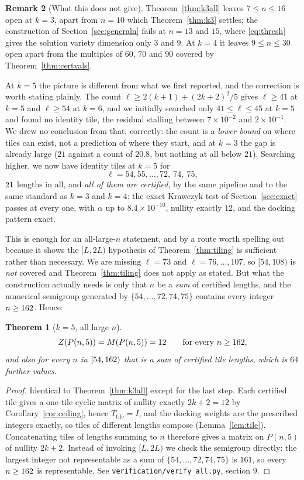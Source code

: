 \documentclass[11pt]{article}
\newtheorem{theorem}{Theorem}
\theoremstyle{definition}
\newtheorem{remark}[theorem]{Remark}
\begin{document}
\begin{remark}[What this does not give]
Theorem~\ref{thm:k3all} leaves $7\le n\le16$ open at $k=3$, apart from $n=10$
which Theorem~\ref{thm:k3} settles; the construction of
Section~\ref{sec:generaln} fails at $n=13$ and $15$, where \eqref{eq:thresh}
gives the solution variety dimension only $3$ and $9$. At $k=4$ it leaves
$9\le n\le30$ open apart from the multiples of $60$, $70$ and $90$ covered by
Theorem~\ref{thm:certvals}.

At $k=5$ the picture is different from what we first reported, and the
correction is worth stating plainly. The count $\ell\ge2(k+1)+(2k+2)^{2}/5$ gives
$\ell\ge41$ at $k=5$ and $\ell\ge54$ at $k=6$, and we initially searched only
$41\le\ell\le45$ at $k=5$ and found no identity tile, the residual stalling
between $7\times10^{-2}$ and $2\times10^{-1}$. We drew no conclusion from that,
correctly: the count is a \emph{lower bound} on where tiles can exist, not a
prediction of where they start, and at $k=3$ the gap is already large ($21$
against a count of $20.8$, but nothing at all below $21$). Searching higher, we
now have identity tiles at $k=5$ for
\[
  \ell = 54,55,\dots,72,\ 74,\ 75 ,
\]
$21$ lengths in all, and \emph{all of them are certified}, by the same
pipeline and to the same standard as $k=3$ and $k=4$: the exact Krawczyk test of
Section~\ref{sec:exact} passes at every one, with $\alpha$ up to
$8.4\times10^{-10}$, nullity exactly $12$, and the docking pattern exact.

This is enough for an all-large-$n$ statement, and by a route worth spelling out
because it shows the $[L,2L)$ hypothesis of Theorem~\ref{thm:tiling} is
sufficient rather than necessary. We are missing $\ell=73$ and $\ell=76,\dots,107$,
so $[54,108)$ is \emph{not} covered and Theorem~\ref{thm:tiling} does not apply
as stated. But what the construction actually needs is only that $n$ be a
\emph{sum} of certified lengths, and the numerical semigroup generated by
$\{54,\dots,72,74,75\}$ contains every integer $n\ge162$. Hence:

\begin{theorem}[$k=5$, all large $n$]\label{thm:k5all}
\[
  Z(P(n,5))=M(P(n,5))=12\qquad\text{for every } n\ge162,
\]
and also for every $n$ in $[54,162)$ that is a sum of certified tile
lengths, which is $64$ further values.
\end{theorem}

\begin{proof}
Identical to Theorem~\ref{thm:k3all} except for the last step. Each certified
tile gives a one-tile cyclic matrix of nullity exactly $2k+2=12$ by
Corollary~\ref{cor:ceiling}, hence $T_{\text{tile}}=I$, and the docking weights
are the prescribed integers exactly, so tiles of different lengths compose
(Lemma~\ref{lem:tile}). Concatenating tiles of lengths summing to $n$ therefore
gives a matrix on $P(n,5)$ of nullity $2k+2$. Instead of invoking
$[L,2L)$ we check the semigroup directly: the largest integer not representable
as a sum of $\{54,\dots,72,74,75\}$ is $161$, so every $n\ge162$ is
representable. See \texttt{verification/verify\_all.py}, section 9.
\end{proof}


\end{remark}
\end{document}
